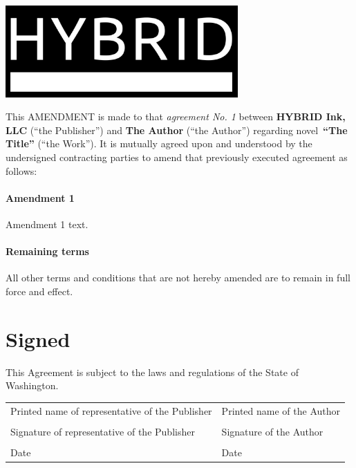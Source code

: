 \documentclass[12pt,letterpaper]{article}
\def\WorkTitle{The Title}
\def\WorkAuthor{The Author}
\def\WorkType{novel}
\def\ContractNumber{1}
\begin{document}
\begin{center}
\noindent\includegraphics[width=3.5in]{logo}
\end{center}

\vspace{0.5in}

\noindent This AMENDMENT is made to that \emph{agreement No. \ContractNumber} between \textbf{HYBRID Ink, LLC} (``the Publisher'') and \textbf{\WorkAuthor} (``the Author'') regarding \WorkType\ \textbf{``\WorkTitle''} (``the Work''). It is mutually agreed upon and understood by the undersigned contracting parties to amend that previously executed agreement as follows:

\paragraph{Amendment 1}

Amendment 1 text.

\paragraph{Remaining terms}

All other terms and conditions that are not hereby amended are to remain in full force and effect.

\newpage

\thispagestyle{final}

\section*{Signed}

This Agreement is subject to the laws and regulations of the State of Washington.

\begin{tabular}{p{3in} p{3in}}
    \vspace{0.5in} & \\ \hline
    Printed name of representative of the Publisher & Printed name of the Author \\
    \vspace{0.5in} & \\ \hline
    Signature of representative of the Publisher & Signature of the Author \\
    \vspace{0.5in} & \\ \hline
    Date & Date \\
\end{tabular}
\end{document}
